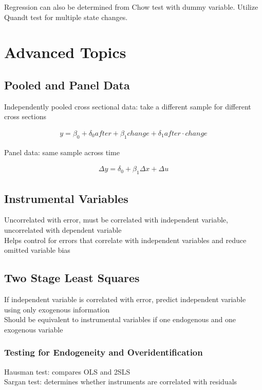 \documentclass[12pt]{article}
\numberwithin{equation}{section}
\begin{document}
Regression can also be determined from Chow test with dummy variable. Utilize Quandt test for multiple state changes.

\section{Advanced Topics}

\subsection{Pooled and Panel Data}
Independently pooled cross sectional data: take a different sample for different cross sections

\begin{gather}
    y = \beta_0 + \delta_0 after + \beta_1 change + \delta_1 after\cdot change
\end{gather}

Panel data: same sample across time

\begin{gather}
    \Delta y = \delta_0 + \beta_1 \Delta x + \Delta u
\end{gather}

\subsection{Instrumental Variables}
Uncorrelated with error, must be correlated with independent variable, uncorrelated with dependent variable \\[0.5cm]
Helps control for errors that correlate with independent variables and reduce omitted variable bias

\subsection{Two Stage Least Squares}
If independent variable is correlated with error, predict independent variable using only exogenous information \\[0.5cm]
Should be equivalent to instrumental variables if one endogenous and one exogenous variable 

\subsubsection{Testing for Endogeneity and Overidentification}
Hausman test: compares OLS and 2SLS \\
Sargan test: determines whether instruments are correlated with residuals
\end{document}
